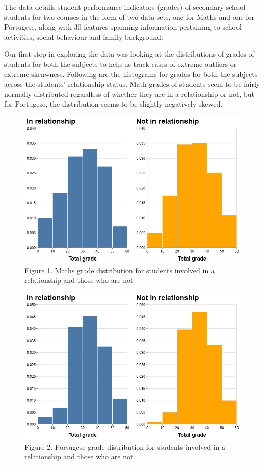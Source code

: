 \documentclass[]{article}
\begin{document}
The data details student performance indicators (grades) of secondary
school students for two courses in the form of two data sets, one for
Maths and one for Portugese, along with 30 features spanning information
pertaining to school activities, social behaviour and family background.

Our first step in exploring the data was looking at the distributions of
grades of students for both the subjects to help us track cases of
extreme outliers or extreme skenwness. Following are the histograms for
grades for both the subjects across the students' relationship status.
Math grades of students seem to be fairly normally distributed
regardless of whether they are in a relationship or not, but for
Portugese, the distribution seems to be slightly negatively skewed.

\begin{figure}

{\centering \includegraphics[width=0.6\linewidth]{../results/figures/math_plot} 

}

\caption{Figure 1. Maths grade distribution for students involved in a relationship and those who are not}\label{fig:math_grade_distribution}
\end{figure}

\begin{figure}

{\centering \includegraphics[width=0.6\linewidth]{../results/figures/por_plot} 

}

\caption{Figure 2. Portugese grade distribution for students involved in a relationship and those who are not}\label{fig:port_grade_distribution}
\end{figure}
\end{document}
